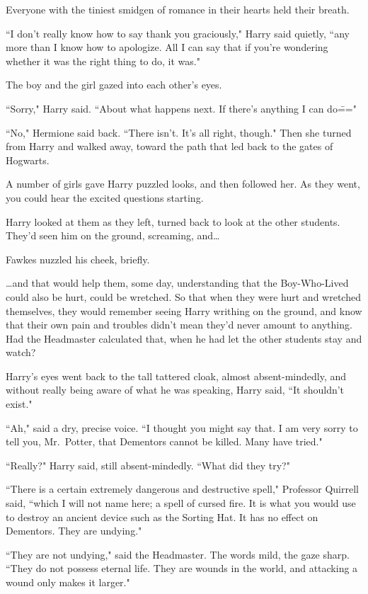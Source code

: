Everyone with the tiniest smidgen of romance in their hearts held their breath.

``I don't really know how to say thank you graciously," Harry said quietly, ``any more than I know how to apologize. All I can say that if you're wondering whether it was the right thing to do, it was."

The boy and the girl gazed into each other's eyes.

``Sorry," Harry said. ``About what happens next. If there's anything I can do\==="

``No," Hermione said back. ``There isn't. It's all right, though." Then she turned from Harry and walked away, toward the path that led back to the gates of Hogwarts.

A number of girls gave Harry puzzled looks, and then followed her. As they went, you could hear the excited questions starting.

Harry looked at them as they left, turned back to look at the other students. They'd seen him on the ground, screaming, and{\ldots}

Fawkes nuzzled his cheek, briefly.

{\ldots}and that would help them, some day, understanding that the Boy-Who-Lived could also be hurt, could be wretched. So that when they were hurt and wretched themselves, they would remember seeing Harry writhing on the ground, and know that their own pain and troubles didn't mean they'd never amount to anything. Had the Headmaster calculated that, when he had let the other students stay and watch?

Harry's eyes went back to the tall tattered cloak, almost absent-mindedly, and without really being aware of what he was speaking, Harry said, ``It shouldn't exist."

``Ah," said a dry, precise voice. ``I thought you might say that. I am very sorry to tell you, Mr.~Potter, that Dementors cannot be killed. Many have tried."

``Really?" Harry said, still absent-mindedly. ``What did they try?"

``There is a certain extremely dangerous and destructive spell," Professor Quirrell said, ``which I will not name here; a spell of cursed fire. It is what you would use to destroy an ancient device such as the Sorting Hat. It has no effect on Dementors. They are undying."

``They are not undying," said the Headmaster. The words mild, the gaze sharp. ``They do not possess eternal life. They are wounds in the world, and attacking a wound only makes it larger."

